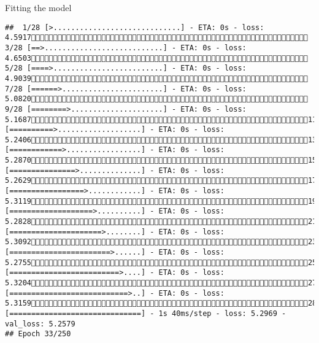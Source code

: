 \documentclass[
  ignorenonframetext,
]{beamer}
\begin{document}
\begin{frame}[fragile]{Fitting the model}
\begin{verbatim}
##  1/28 [>.............................] - ETA: 0s - loss: 4.5917 3/28 [==>...........................] - ETA: 0s - loss: 4.6503 5/28 [====>.........................] - ETA: 0s - loss: 4.9039 7/28 [======>.......................] - ETA: 0s - loss: 5.0820 9/28 [========>.....................] - ETA: 0s - loss: 5.168711/28 [==========>...................] - ETA: 0s - loss: 5.240613/28 [============>.................] - ETA: 0s - loss: 5.287015/28 [===============>..............] - ETA: 0s - loss: 5.262917/28 [=================>............] - ETA: 0s - loss: 5.311919/28 [===================>..........] - ETA: 0s - loss: 5.282821/28 [=====================>........] - ETA: 0s - loss: 5.309223/28 [=======================>......] - ETA: 0s - loss: 5.275525/28 [=========================>....] - ETA: 0s - loss: 5.320427/28 [===========================>..] - ETA: 0s - loss: 5.315928/28 [==============================] - 1s 40ms/step - loss: 5.2969 - val_loss: 5.2579
## Epoch 33/250

\end{verbatim}
\end{frame}
\end{document}
